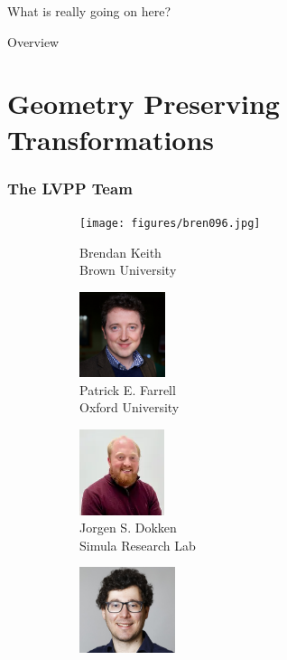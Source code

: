\documentclass[aspectratio=169,xcolor=dvipsnames,11pt]{beamer}
\begin{document}
\begin{frame}[plain,c]
\hfill
\begin{center}
\Huge What is really going on here?
\end{center}
\hfill
\end{frame}

\begin{frame}{Overview}

\tableofcontents
\end{frame}


\section{Geometry Preserving Transformations}
\begin{frame}\frametitle{The LVPP Team}
\captionsetup[subfigure]{labelformat=empty}
\begin{figure}
  \begin{subfigure}[b]{2.75cm}
    \texttt{[image: figures/bren096.jpg]}
    \caption{Brendan Keith\\ Brown University}
  \end{subfigure}
  \hfill
  \begin{subfigure}[b]{2.75cm}
    \includegraphics[width=\linewidth,height=2.5cm, keepaspectratio]{figures/patrick.jpg}
    \caption{Patrick E. Farrell\\ Oxford University}
  \end{subfigure}
  \hfill
  \begin{subfigure}[b]{2.75cm}
    \includegraphics[width=\linewidth,height=2.5cm, keepaspectratio]{figures/joergen.png}
    \caption{Jorgen S. Dokken\\ Simula Research Lab}
  \end{subfigure}
   \hfill
  \begin{subfigure}[b]{3.2cm}
    \includegraphics[width=\linewidth,height=2.5cm, keepaspectratio]{figures/papadopoulos.jpg}

\end{subfigure}
\end{figure}
\end{frame}
\end{document}
